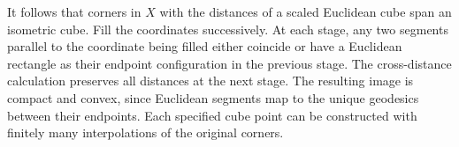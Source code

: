 It follows that corners in $X$ with the distances of a scaled Euclidean cube span an isometric cube. Fill the coordinates successively. At each stage, any two segments parallel to the coordinate being filled either coincide or have a Euclidean rectangle as their endpoint configuration in the previous stage. The cross-distance calculation preserves all distances at the next stage. The resulting image is compact and convex, since Euclidean segments map to the unique geodesics between their endpoints. Each specified cube point can be constructed with finitely many interpolations of the original corners.

